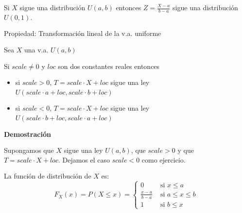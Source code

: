 \documentclass[
  letterpaper,
  DIV=11,
  numbers=noendperiod]{scrreprt}
\providecommand{\tightlist}{%
  \setlength{\itemsep}{0pt}\setlength{\parskip}{0pt}}\usepackage{longtable,booktabs,array}
\begin{document}
Si \(X\) sigue una distribución \(U(a,b)\) entonces
\(Z=\frac{X-a}{b-a}\) sigue una distribución \(U(0,1)\).

\begin{Proposicion}{Propiedad: Transformación lineal de la v.a. uniforme}{}

Sea \(X\) una v.a. \(U(a,b)\)

Si \(scale\not=0\) y \(loc\) son dos constantes reales entonces

\begin{itemize}
\tightlist
\item
  si \(scale>0\), \(T=scale\cdot X+loc\) sigue una ley
  \(U(scale\cdot a +loc,scale\cdot b +loc)\)
\item
  si \(scale<0\), \(T=scale\cdot X+loc\) sigue una ley
  \(U(scale\cdot b +loc,scale\cdot a +loc)\)
\end{itemize}

\end{Proposicion}

\textbf{Demostración}

Supongamos que \(X\) sigue una ley \(U(a,b)\), que \(scale>0\) y que
\(T=scale\cdot X+loc\). Dejamos el caso \(scale<0\) como ejercicio.

La función de distribución de \(X\) es: \[
F_X(x)=P(X\leq x)=\left\{\begin{array}{ll} 0 & \mbox{ si } x\leq a\\
\frac{x-a}{b-a} & \mbox{ si } a\leq x\leq b \\1 & \mbox{ si } b\leq x\end{array}\right.
\]
\end{document}
